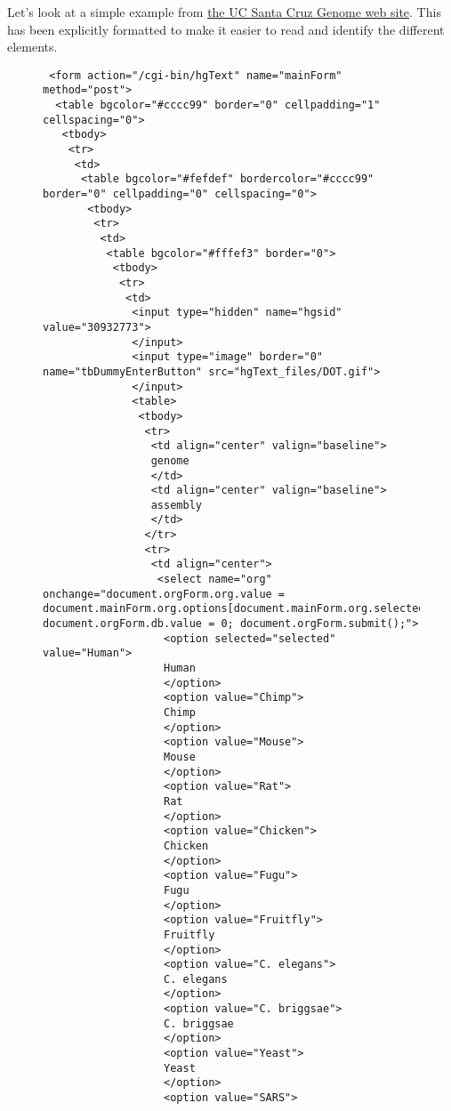\documentclass{article}
\begin{document}
Let's look at a simple example
from  \href{http://www.genome.ucsc.edu/cgi-bin/hgText}{the UC Santa
  Cruz Genome web site}.
This has been explicitly formatted
to make it easier to read and identify the different
elements.
\begin{figure}%
  \begin{center}
    \leavevmode
\begin{verbatim}
 <form action="/cgi-bin/hgText" name="mainForm" method="post">
  <table bgcolor="#cccc99" border="0" cellpadding="1" cellspacing="0">
   <tbody>
    <tr>
     <td>
      <table bgcolor="#fefdef" bordercolor="#cccc99" border="0" cellpadding="0" cellspacing="0">
       <tbody>
        <tr>
         <td>
          <table bgcolor="#fffef3" border="0">
           <tbody>
            <tr>
             <td>
              <input type="hidden" name="hgsid" value="30932773">
              </input>
              <input type="image" border="0" name="tbDummyEnterButton" src="hgText_files/DOT.gif">
              </input>
              <table>
               <tbody>
                <tr>
                 <td align="center" valign="baseline">
                 genome
                 </td>
                 <td align="center" valign="baseline">
                 assembly
                 </td>
                </tr>
                <tr>
                 <td align="center">
                  <select name="org" onchange="document.orgForm.org.value = document.mainForm.org.options[document.mainForm.org.selectedIndex].value; document.orgForm.db.value = 0; document.orgForm.submit();">
                   <option selected="selected" value="Human">
                   Human
                   </option>
                   <option value="Chimp">
                   Chimp
                   </option>
                   <option value="Mouse">
                   Mouse
                   </option>
                   <option value="Rat">
                   Rat
                   </option>
                   <option value="Chicken">
                   Chicken
                   </option>
                   <option value="Fugu">
                   Fugu
                   </option>
                   <option value="Fruitfly">
                   Fruitfly
                   </option>
                   <option value="C. elegans">
                   C. elegans
                   </option>
                   <option value="C. briggsae">
                   C. briggsae
                   </option>
                   <option value="Yeast">
                   Yeast
                   </option>
                   <option value="SARS">

\end{verbatim}
\end{center}
\end{figure}
\end{document}
